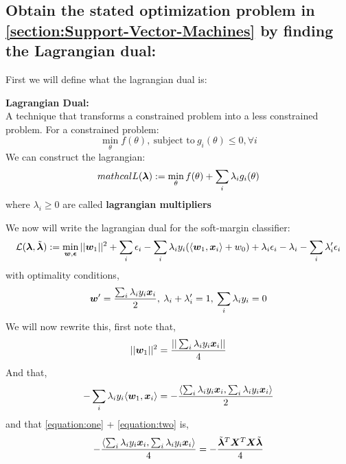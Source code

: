 \begin{appendices}
\subsection{Obtain the stated optimization problem in \cref{section:Support-Vector-Machines} by finding the Lagrangian dual:} \label{Proofs:lagrangian-dual}
First we will define what the lagrangian dual is:
\begin{definition}
    \textbf{Lagrangian Dual:}\\
    A technique that transforms a constrained problem into a less constrained problem. For a constrained problem:
    \begin{equation}
        \min_{\theta} f(\theta), \: \text{subject to} \: g_{i}(\theta)\leq 0, \forall i
    \end{equation}
    We can construct the lagrangian:
    \begin{equation}
        mathcal{L}(\bm{\lambda}) := \min_{\theta} f(\theta) + \sum_{i} \lambda_{i} g_{i}(\theta)
    \end{equation}
    where $\lambda_{i} \geq 0$ are called \textbf{lagrangian multipliers}
\end{definition}
We now will write the lagrangian dual for the soft-margin classifier:
\begin{equation}
    \mathcal{L}(\bm{\lambda}, \tilde{\bm{\lambda}}) := \min_{\bm{w},\bm{\epsilon}} ||\bm{w}_{1}||^{2} +\sum_{i} \epsilon_{i} - \sum_{i} \lambda_{i} y_{i} (\langle \bm{w}_{1},\bm{x}_{i} \rangle + w_{0}) + \lambda_{i} \epsilon_{i} -\lambda_{i} - \sum_{i} \lambda_{i}' \epsilon_{i}
\end{equation}
with optimality conditions,
\begin{equation}
    \bm{w}' = \frac{\sum_{i} \lambda_{i} y_{i} \bm{x}_{i}}{2}, \: \lambda_{i} + \lambda_{i}' =1, \: \sum_{i} \lambda_{i} y_{i} = 0
\end{equation}
We will now rewrite this, first note that,
\begin{equation}\label{equation:one}
    ||\bm{w}_{1}||^{2} = \frac{||\sum_{i} \lambda_{i} y_{i} \bm{x}_{i}||}{4}
\end{equation}
And that,
\begin{equation}\label{equation:two}
    - \sum_{i} \lambda_{i} y_{i} \langle \bm{w}_{1} ,\bm{x}_{i} \rangle = - \frac{\langle\sum_{i} \lambda_{i} y_{i} \bm{x}_{i}, \sum_{i} \lambda_{i} y_{i} \bm{x}_{i} \rangle}{2}
\end{equation} 
and that \cref{equation:one} + \cref{equation:two} is,
\begin{equation}
    - \frac{\langle\sum_{i} \lambda_{i} y_{i} \xui, \sum_{i} \lambda_{i} y_{i} \xui \rangle}{4} = - \frac{\bmlt^{T} \X^{T} \X \bmlt}{4}

\end{equation}
\end{appendices}
